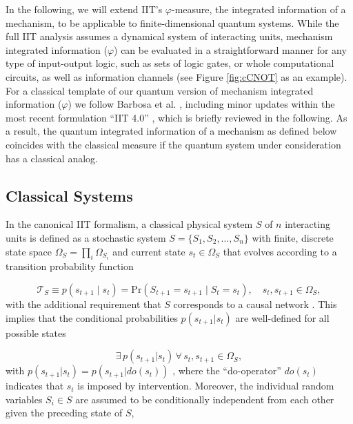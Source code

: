 \documentclass[preprints, article, accept, pdftex, moreauthors, letterpaper]{Definitions/mdpi}
\renewcommand{\=}[1]{\stackrel{#1}{=}} %
\renewcommand{\P}{\text{Pr}} %
\newcommand{\T}{\mathcal{T}} %
\renewcommand{\*}{\otimes}%
\begin{document}
In the following, we will extend IIT's $\varphi$-measure, the integrated information of a mechanism, to be applicable to finite-dimensional quantum systems. While the full IIT analysis assumes a dynamical system of interacting units, mechanism integrated information ($\varphi$) can be evaluated in a straightforward manner for any type of input-output logic, such as sets of logic gates, or whole computational circuits, as well as information channels (see Figure \ref{fig:cCNOT} as an example). 
For a classical template of our quantum version of mechanism integrated information ($\varphi$) we follow Barbosa et al. \cite{Barbosa2021}, including minor updates within the most recent formulation ``IIT 4.0'' \cite{Albantakis2022_4_0}, which is briefly reviewed in the following. 
As a result, the quantum integrated information of a mechanism as defined below coincides with the classical measure \cite{Barbosa2021, Albantakis2022_4_0} if the quantum system under consideration has a classical analog.

\subsection{Classical Systems}
In the canonical IIT formalism, a classical physical system $S$ of $n$ interacting units is defined as a stochastic system $S = \{S_1, S_2, \ldots, S_n\}$ with finite, discrete state space $\Omega_S = \prod_i \Omega_{S_i}$ and current state $s_t \in \Omega_S$ \cite{Barbosa2021} that evolves according to a transition probability function 

\begin{equation}
\label{eq:tpm}
\T_S \equiv p(s_{t+1}\mid s_t) = \P(S_{t + 1} = s_{t+1}\mid S_t = s_t), \quad s_t, s_{t+1} \in \Omega_S,
\end{equation}
%
with the additional requirement that $S$ corresponds to a causal network \cite{Barbosa2021}. This implies that the conditional probabilities $p(s_{t+1}|s_t)$ are well-defined for all possible states 

\begin{equation}
    \exists \, p(s_{t+1}|s_t) \, \forall \, s_{t}, s_{t+1} \in \Omega_S,
\end{equation}
%
with $p(s_{t+1}|s_t) = p(s_{t+1}|do(s_t))$ \cite{Albantakis2019, Janzing2013, Ay2008, Pearl2000}, where the ``do-operator'' $do(s_t)$ indicates that $s_t$ is imposed by intervention. Moreover, the individual random variables $S_i \in S$ are assumed to be conditionally independent from each other given the preceding state of $S$, 
\end{document}
